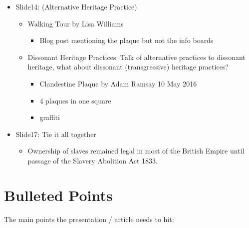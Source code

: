 \documentclass{scrartcl}
\begin{document}
    \begin{itemize}
        \item Slide14: (Alternative Heritage Practice)
        \begin{itemize}
            \item Walking Tour by Lisa Williams
            \begin{itemize}
                \item Blog post mentioning the plaque but not the info boards
            \end{itemize}
            \item Dissonant Heritage Practices: Talk of alternative practices to dissonant heritage, what about dissonant (transgressive) heritage practices?
            \begin{itemize}
                \item Clandestine Plaque by Adam Ramsay 10 May 2016
            \end{itemize}
            \begin{itemize}
                \item 4 plaques in one square
                \item graffiti
            \end{itemize}
        \end{itemize}
\item Slide17: Tie it all together
\begin{itemize}
    \item Ownership of slaves remained legal in most of the British Empire until passage of the Slavery Abolition Act 1833.
\end{itemize}
\end{itemize}

\section{Bulleted Points}

The main points the presentation / article needs to hit:
\end{document}
